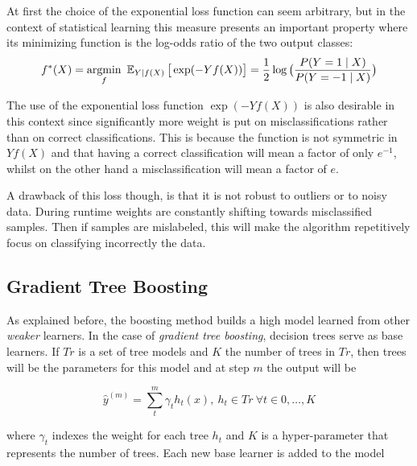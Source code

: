 At first the choice of the exponential loss function can seem arbitrary, but in the context of statistical learning this measure presents an important property where its minimizing function is the log-odds ratio of the two output classes:
\begin{equation}
f^*(X) = \underset{f}{\mathrm{argmin}} \ \Expect_{Y | f(X)}\big[ \exp(-Yf(X)) \big] = \frac{1}{2}\log\big( \frac{ P(Y=1 \mid X) }{ P(Y=-1 \mid X) } \big)
\end{equation}


The use of the exponential loss function $\exp(-Yf(X))$ is also desirable in this context since significantly more weight is put on misclassifications rather than on correct classifications. This is because the function is not symmetric in $Yf(X)$ and that having a correct classification will mean a factor of only $e^{-1}$, whilst on the other hand a misclassification will mean a factor of $e$.

A drawback of this loss though, is that it is not robust to outliers or to noisy data. During runtime weights are constantly shifting towards misclassified samples. Then if samples are mislabeled, this will make the algorithm repetitively focus on classifying incorrectly the data.



\subsection{Gradient Tree Boosting}


As explained before, the boosting method builds a high model learned from other \textit{weaker} learners. In the case of \textit{gradient tree boosting}, decision trees serve as base learners. If $Tr$ is a set of tree models and $K$ the number of trees in $Tr$, then trees will be the parameters for this model and at step $m$ the output will be

\begin{equation}
\hat{y}^{(m)}= \sum_t^m \gamma_t h_t(x) , \ h_t \in Tr \ \forall t \in {0,\ldots,K}
\end{equation}

where $\gamma_t$ indexes the weight for each tree $h_t$ and $K$ is a hyper-parameter that represents the number of trees. Each new base learner is added to the model

